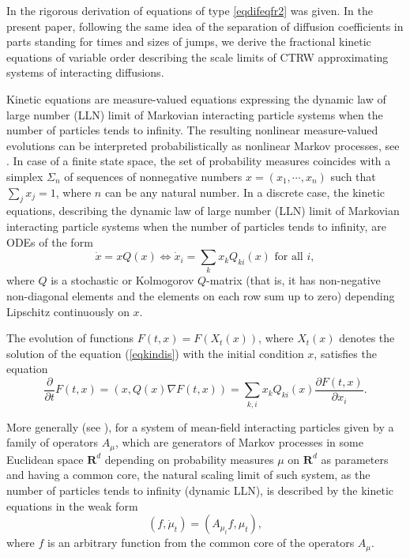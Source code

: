 \documentclass[12pt]{article}
\def\R{\mathbf{R}}
\def\pa{\partial}
\newcommand{\Si}{\Sigma}
\numberwithin{equation}{section}
\begin{document}
In \cite{Ko22} the rigorous derivation of equations of type \eqref{eqdifeqfr2} was given.
In the present paper, following the same idea of the separation of diffusion coefficients in parts
standing for times and sizes of jumps, we derive the fractional kinetic equations of variable order
describing the scale limits of CTRW approximating systems of interacting diffusions.

Kinetic equations are measure-valued equations expressing the dynamic law of large number (LLN) limit of Markovian
interacting particle systems when the number of particles tends to infinity. The resulting nonlinear measure-valued
evolutions can be interpreted probabilistically as nonlinear Markov processes, see \cite{Ko10}.
In case of a finite state space, the set of probability measures coincides with a simplex $\Si_n$ of sequences
of nonnegative numbers $x=(x_1, \cdots, x_n)$ such that $\sum_j x_j=1$, where $n$ can be any natural number.
In a discrete case, the kinetic equations, describing the dynamic law of large number (LLN) limit of Markovian
interacting particle systems when the number of particles tends to infinity, are ODEs of the form
\begin{equation}
\label{eqkindis}
\dot x= xQ(x) \Longleftrightarrow \dot x_i=\sum_k x_k Q_{ki}(x) \,\, \text{for all} \,\, i,
\end{equation}
where $Q$ is a stochastic or Kolmogorov $Q$-matrix (that is, it has non-negative non-diagonal elements
and the elements on each row sum up to zero) depending Lipschitz continuously on $x$.

The evolution of functions $F(t,x)=F(X_t(x))$, where $X_t (x)$ denotes the solution of the equation (\ref{eqkindis}) with the initial condition $x$, satisfies the equation
\begin{equation}
\label{eqkindisfu}
\frac{\pa}{\pa t} F(t,x)=(x,Q(x) \nabla F(t,x))=\sum_{k,i}x_k Q_{ki}(x)\frac{\pa F(t,x)}{\pa x_i}.
\end{equation}

More generally (see \cite{Ko10}), for a system of mean-field interacting particles given by a family of operators $A_{\mu}$,
which are generators of Markov processes in some Euclidean space $\R^d$ depending on probability measures $\mu$ on $\R^d$
as parameters and having a common core, the natural scaling limit of such system, as the number of particles tends to infinity
(dynamic LLN), is
described by the kinetic equations in the weak form
\begin{equation}
\label{eqkin}
(f, \dot \mu_t) = (A_{\mu_t}f,\mu_t),
\end{equation}
where $f$ is an arbitrary function from the common core of the operators $A_{\mu}$.
\end{document}
